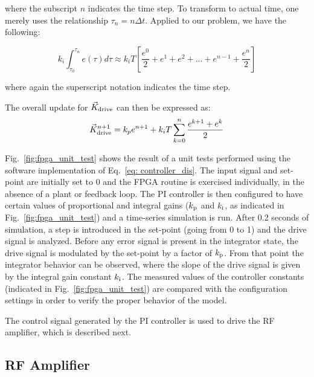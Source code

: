\documentclass[a4paper,12pt]{article}
\newcommand{\be}{\begin{equation}}
\newcommand{\ee}{\end{equation}}
\begin{document}
\noindent where the subscript $n$ indicates the time step. To transform to actual time, one merely uses the relationship $\tau_{n} = n\Delta t$. Applied to our problem, we have the following:

\be
k_{i} \int_{\tau_{0}}^{\tau_{n}} e(\tau)d\tau \approx k_{i}T
	      \left[\frac{e^{0}}{2} + e^{1} + e^{2} + ...
		+ e^{n-1} + \frac{e^{n}}{2} \right]
\ee

\noindent where again the superscript notation indicates the time step.

The overall update for $\vec{K}_{\rm drive}$ can then be expressed as:
\be \label{eq: controller_dis}
\vec{K}_{\rm drive}^{n+1} = k_{p} e^{n+1} + k_{i}T \sum_{k=0}^{n}\frac{e^{k+1}+e^k}{2}
\ee

Fig.~\ref{fig:fpga_unit_test} shows the result of a unit tests performed using the software implementation of Eq.~\ref{eq: controller_dis}. The input signal and set-point are initially set to 0 and the FPGA routine is exercised individually, in the absence of a plant or feedback loop. The PI controller is then configured to have certain values of proportional and integral gains ($k_{\rm p}$ and $k_{\rm i}$, as indicated in Fig.~\ref{fig:fpga_unit_test}) and a time-series simulation is run. After 0.2 seconds of simulation, a step is introduced in the set-point (going from 0 to 1) and the drive signal is analyzed. Before any error signal is present in the integrator state, the drive signal is modulated by the set-point by a factor of $k_{\rm p}$. From that point the integrator behavior can be observed, where the slope of the drive signal is given by the integral gain constant $k_{\rm i}$. The measured values of the controller constants (indicated in Fig.~\ref{fig:fpga_unit_test}) are compared with the configuration settings in order to verify the proper behavior of the model.

The control signal generated by the PI controller is used to drive the RF amplifier, which is described next.

\subsection{RF Amplifier}
\end{document}

